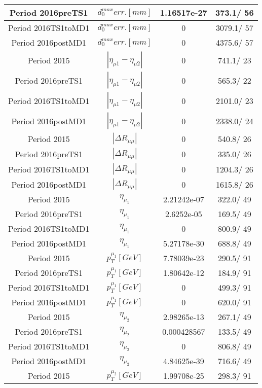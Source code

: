 \documentclass{article}
\begin{document}
\begin{longtable}{c|c|c|c}
\hline
 Period 2016preTS1 & $d_{0}^{max} err. [mm]$ & 1.16517e-27 & 373.1/ 56\\
\hline
 Period 2016TS1toMD1 & $d_{0}^{max} err. [mm]$ & 0 & 3079.1/ 57\\
\hline
 Period 2016postMD1 & $d_{0}^{max} err. [mm]$ & 0 & 4375.6/ 57\\
\hline
 Period 2015 & $|\eta_{\mu1}-\eta_{\mu2}|$ & 0 & 741.1/ 23\\
\hline
 Period 2016preTS1 & $|\eta_{\mu1}-\eta_{\mu2}|$ & 0 & 565.3/ 22\\
\hline
 Period 2016TS1toMD1 & $|\eta_{\mu1}-\eta_{\mu2}|$ & 0 & 2101.0/ 23\\
\hline
 Period 2016postMD1 & $|\eta_{\mu1}-\eta_{\mu2}|$ & 0 & 2338.0/ 24\\
\hline
 Period 2015 & $|\Delta R_{\mu \mu}|$ & 0 & 540.8/ 26\\
\hline
 Period 2016preTS1 & $|\Delta R_{\mu \mu}|$ & 0 & 335.0/ 26\\
\hline
 Period 2016TS1toMD1 & $|\Delta R_{\mu \mu}|$ & 0 & 1204.3/ 26\\
\hline
 Period 2016postMD1 & $|\Delta R_{\mu \mu}|$ & 0 & 1615.8/ 26\\
\hline
 Period 2015 & $\eta_{\mu_{1}}$ & 2.21242e-07 & 322.0/ 49\\
\hline
 Period 2016preTS1 & $\eta_{\mu_{1}}$ & 2.6252e-05 & 169.5/ 49\\
\hline
 Period 2016TS1toMD1 & $\eta_{\mu_{1}}$ & 0 & 800.9/ 49\\
\hline
 Period 2016postMD1 & $\eta_{\mu_{1}}$ & 5.27178e-30 & 688.8/ 49\\
\hline
 Period 2015 & $p_{T}^{\mu_{1}} [GeV]$ & 7.78039e-23 & 290.5/ 91\\
\hline
 Period 2016preTS1 & $p_{T}^{\mu_{1}} [GeV]$ & 1.80642e-12 & 184.9/ 91\\
\hline
 Period 2016TS1toMD1 & $p_{T}^{\mu_{1}} [GeV]$ & 0 & 499.3/ 91\\
\hline
 Period 2016postMD1 & $p_{T}^{\mu_{1}} [GeV]$ & 0 & 620.0/ 91\\
\hline
 Period 2015 & $\eta_{\mu_{2}}$ & 2.98265e-13 & 267.1/ 49\\
\hline
 Period 2016preTS1 & $\eta_{\mu_{2}}$ & 0.000428567 & 133.5/ 49\\
\hline
 Period 2016TS1toMD1 & $\eta_{\mu_{2}}$ & 0 & 806.8/ 49\\
\hline
 Period 2016postMD1 & $\eta_{\mu_{2}}$ & 4.84625e-39 & 716.6/ 49\\
\hline
 Period 2015 & $p_{T}^{\mu_{2}} [GeV]$ & 1.99708e-25 & 298.3/ 91\\

\end{longtable}
\end{document}
